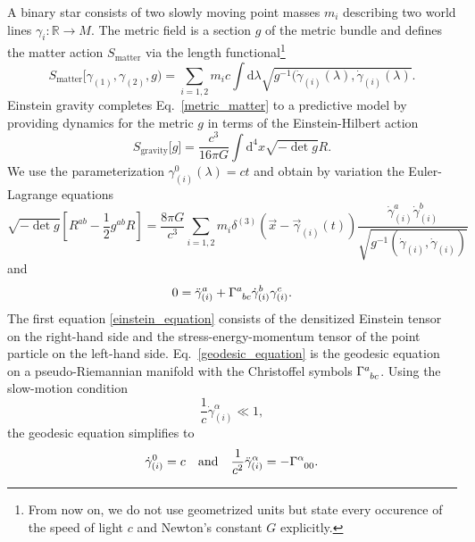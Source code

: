 A binary star consists of two slowly moving point masses $m_i$ describing two world lines $\gamma_i\colon\mathbb R\rightarrow M$. The metric field is a section $g$ of the metric bundle and defines the matter action $S_\text{matter}$ via the length functional\footnote{From now on, we do not use geometrized units but state every occurence of the speed of light $c$ and Newton's constant $G$ explicitly.}
\begin{equation}\label{metric_matter}
  S_\text{matter}\lbrack\gamma_{(1)},\gamma_{(2)},g) = \sum_{i=1,2} m_i c \int \mathrm d\lambda \sqrt{g^{-1}(\dot\gamma_{(i)}(\lambda),\dot\gamma_{(i)}(\lambda)}.
\end{equation}
Einstein gravity completes Eq.~\eqref{metric_matter} to a predictive model by providing dynamics for the metric $g$ in terms of the Einstein-Hilbert action
\begin{equation}
  S_\text{gravity}\lbrack g\rbrack = \frac{c^3}{16\pi G}\int\mathrm d^4x \sqrt{-\operatorname{det}g}R.
\end{equation}
We use the parameterization $\gamma_{(i)}^0(\lambda) = ct$ and obtain by variation the Euler-Lagrange equations
\begin{equation}\label{einstein_equation}
  \sqrt{-\operatorname{det}g}\left\lbrack R^{ab} - \frac{1}{2} g^{ab} R\right\rbrack = \frac{8\pi G}{c^3} \sum_{i=1,2} m_i \delta^{(3)}(\vec x-\vec\gamma_{(i)}(t))\frac{\dot\gamma^a_{(i)}\dot\gamma^b_{(i)}}{\sqrt{g^{-1}(\dot\gamma_{(i)},\dot\gamma_{(i)})}}
\end{equation}
and
\begin{equation}\label{geodesic_equation}
  0 = \ddot\gamma^a_{(i)} + \Gamma^a_{\hphantom abc}\dot\gamma^b_{(i)}\gamma^c_{(i)}.
\end{equation}
The first equation \eqref{einstein_equation} consists of the densitized Einstein tensor on the right-hand side and the stress-energy-momentum tensor of the point particle on the left-hand side. Eq.~\eqref{geodesic_equation} is the geodesic equation on a pseudo-Riemannian manifold with the Christoffel symbols $\Gamma^a_{\hphantom abc}$. Using the slow-motion condition
\begin{equation}
  \frac{1}{c} \dot\gamma^\alpha_{(i)} \ll 1,
\end{equation}
the geodesic equation simplifies to
\begin{equation}
  \dot\gamma^0_{(i)} = c\quad\text{and}\quad\frac{1}{c^2}\ddot\gamma^\alpha_{(i)} = - \Gamma^\alpha_{\hphantom\alpha 00}.
\end{equation}

